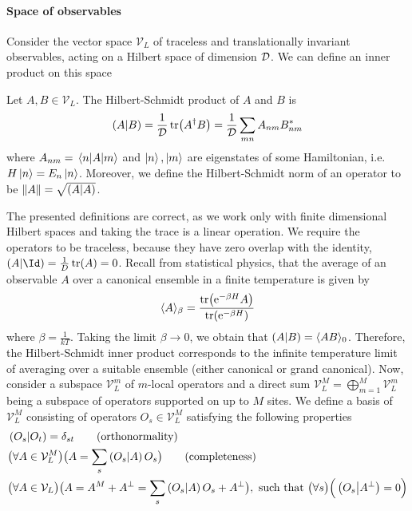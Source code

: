 \paragraph{Space of observables}Consider the vector space \(\mathcal{V}_L\) of traceless and translationally invariant
observables, acting on a Hilbert space of dimension \(\mathcal{D}\). We can define an inner product on this space
\begin{definition}
  Let \(A,B \in \mathcal{V}_L\). The Hilbert-Schmidt product of \(A\) and \(B\) is
  \begin{equation}
    \left(A \middle| B\right) = \frac{1}{\mathcal{D}}\tr(A^{\dagger}B) = \frac{1}{\mathcal{D}} \sum_{mn} A_{nm}B_{nm}^{\ast}
  \end{equation}
  where \(A_{nm} = \matrixel{n}{A}{m}\) and \(\ket{n},\ket{m}\) are eigenstates of some Hamiltonian,
  i.e.\ \(H\ket{n} = E_n \ket{n}\).
  Moreover, we define the Hilbert-Schmidt norm of an operator to be \(\norm{A} = \sqrt{\left(A \middle| A\right)}\).
\end{definition}
The presented definitions are correct, as we work only with finite dimensional Hilbert spaces and taking
the trace is a linear operation. We require the operators to be traceless, because they have zero 
overlap with the identity, \(\left(A|\Id\right)=\frac{1}{D}\tr(A) = 0\).
Recall from statistical physics, that the average of an observable \(A\) over a canonical ensemble
in a finite temperature is given by
\begin{equation}
  \langle A \rangle_{\beta} = \frac{\tr(\mathrm{e}^{-\beta H}A)}{\tr(\mathrm{e}^{-\beta H})}
\end{equation}
where \(\beta = \frac{1}{kT}\).
Taking the limit \(\beta \to 0\), we obtain that \(\left(A \middle| B\right) =  \langle AB \rangle_{0}\).
Therefore, the Hilbert-Schmidt inner product corresponds to the infinite temperature 
limit of averaging over a suitable ensemble (either canonical or grand canonical).
Now, consider a subspace \(\mathcal{V}_L^m\) of \(m\)-local operators and a direct sum
\(\mathcal{V}_L^M = \bigoplus_{m = 1}^M \mathcal{V}_L^m\) being a subspace of operators supported on up to \(M\) sites.
We define a basis of \(\mathcal{V}_L^M\) consisting of operators \(O_s\in \mathcal{V}_L^M\)
satisfying the following properties
\begin{align}
   & \hs{O_s}{O_{t}} = \delta_{st} \tag{\text{orthonormality}}                                    \nonumber{}\\
   & \big(\forall A \in \mathcal{V}_L^M\big) \big(A = \sum_s \hs{O_s}{A} O_s\big) \tag{\text{completeness}}   \nonumber{}\\
   & \big(\forall A \in \mathcal{V}_L \big) \big( A = A^M + A^{\perp} = \sum_s \hs{O_s}{A} O_s + A^{\perp}\big) ,
  \text{ such that } \big(\forall s\big) \Big( \hs{O_s}{A^{\perp}} = 0\Big)\label{eq:basis}
\end{align}


